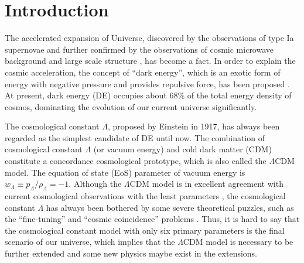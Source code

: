 \documentclass[aps,prd,nofootinbib,amsmath,amssymb,superscriptaddress,twocolumn,10pt]{revtex4}%
\begin{document}
\section{Introduction}\label{sec1}

The accelerated expansion of Universe, discovered by the observations of type Ia supernovae \cite{Riess:1998cb,Perlmutter:1998np} and further confirmed by the observations of cosmic microwave background \cite{Spergel:2003cb,Bennett:2003bz} and large scale structure \cite{Tegmark:2003ud,Abazajian:2004aja}, has become a fact.
In order to explain the cosmic acceleration, the concept of ``dark energy'',  which is an exotic form of energy with negative pressure and provides repulsive force, has been proposed \cite{Sahni:2006pa,Bamba:2012cp,Weinberg:1988cp,Peebles:2002gy,Copeland:2006wr,Frieman:2008sn,Sahni:2008zz,Li:2011sd,Kamionkowski:2007wv}. At present, dark energy (DE) occupies about 68\% of the total energy density of cosmos, dominating the evolution of our current universe significantly.

The cosmological constant $\Lambda$, proposed by Einstein in 1917, has always been regarded as the simplest candidate of DE until now. The combination of cosmological constant $\Lambda$ (or vacuum energy) and cold dark matter (CDM) constitute a concordance cosmological prototype, which is also called the $\Lambda$CDM model. The equation of state (EoS) parameter of vacuum energy is $w_{\Lambda} \equiv p_{\Lambda}/\rho_{\Lambda}=-1$. Although the $\Lambda$CDM model is in excellent agreement with current cosmological observations with the least parameters \cite{Ade:2015xua}, the cosmological constant $\Lambda$ has always been bothered by some severe theoretical puzzles, such as the ``fine-tuning'' and ``cosmic coincidence'' problems \cite{Sahni:1999gb,Bean:2005ru}. Thus, it is hard to say that the cosmological constant model with only six primary parameters is the final scenario of our universe, which implies that the $\Lambda$CDM model is necessary to be further extended and some new physics maybe exist in the extensions.
\end{document}
